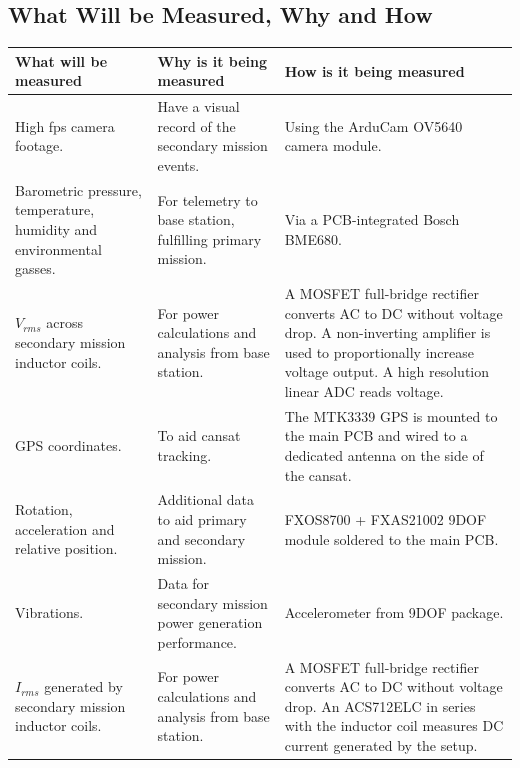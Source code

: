 \documentclass{report}
\begin{document}
		\subsection{What Will be Measured, Why and How}
		\begin{table}[H]
		\setlength{\tabcolsep}{6pt}
		\begin{tabularx}{\textwidth}{@{} YYY @{}}
        		\toprule
        		\textbf{What will be measured} & 
		       \textbf{Why is it being measured} & 
		       \textbf{How is it being measured}\\
		       \midrule
		
		       High fps camera footage. 
		       & Have a visual record of the secondary mission events. 
		       & Using the ArduCam OV5640 camera module.\\
		
		       \addlinespace
		       Barometric pressure, temperature, humidity and environmental gasses. 
		       & For telemetry to base station, fulfilling primary mission. 
		       & Via a PCB-integrated Bosch BME680.\\
		
		       \addlinespace
		       $V_{rms}$ across secondary mission inductor coils. 
		       & For power calculations and analysis from base station. 
		       & A MOSFET full-bridge rectifier converts AC to DC without voltage
			drop. A non-inverting amplifier is used to proportionally increase voltage
			output. A high resolution linear ADC reads voltage.\\
		
		       \addlinespace
		       GPS coordinates. 
		       & To aid cansat tracking. 
		       & The MTK3339 GPS is mounted to the main PCB and wired to a
			dedicated antenna on the side of the cansat.\\
		
		      \addlinespace
		      Rotation, acceleration and relative position. 
		      & Additional data to aid primary and secondary mission. 
		      & FXOS8700 + FXAS21002 9DOF module soldered to the main PCB.\\
		
		      \addlinespace
		      Vibrations. 
		      & Data for secondary mission power generation performance. 
		      & Accelerometer from 9DOF package.\\
	
		      \addlinespace
		      $I_{rms}$ generated by secondary mission inductor coils. 
		      & For power calculations and analysis from base station. 
		      & A MOSFET full-bridge rectifier converts AC to DC without voltage
			drop. An ACS712ELC in series with the inductor coil measures DC 
			current generated by the setup. \\
		     \bottomrule
		\end{tabularx}
		\end{table}
		\vspace{6pt}
\end{document}
